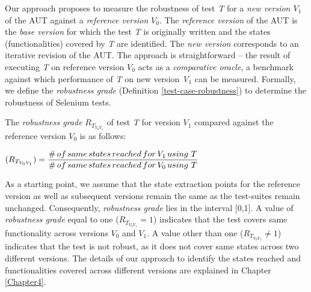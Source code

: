 Our approach proposes to measure the robustness of test \textit{T} for a \textit{new version $V_{1}$} of the AUT against a \textit{reference version} \textit{$V_{0}$}. The \textit{reference version} of the AUT is the \textit{base version} for which the test \textit{T} is originally written and the states (functionalities) covered by \textit{T} are identified. The \textit{new version} corresponds to an iterative revision of the AUT. The approach is straightforward -- the result of executing \textit{T} on reference version \textit{$V_{0}$} acts as a \textit{comparative oracle}, a benchmark against which performance of \textit{T} on new version \textit{V$_{1}$} can be measured. Formally, we define the \textit{
robustness grade} (Definition \ref{test-case-robustness}) to determine the robustness of Selenium tests. 

\theoremstyle{definition}

\begin{definition}{The \textit{robustness grade} $R_{T_{V_{0}V_{1}}}$ of test \textit{T} for version \textit{$V_{1}$} compared against the reference version \textit{$V_{0}$} is as follows:}
\begin{center}
\vspace{0.5cm}
$(R_{T_{V_{0}V_{1}}}) = \displaystyle \frac{\#\thinspace of \thinspace same \thinspace states \thinspace reached \thinspace for \thinspace V_{1} \thinspace using \thinspace \thinspace T}{\# \thinspace of \thinspace same \thinspace states \thinspace reached  \thinspace for \thinspace V_{0} \thinspace using \thinspace \thinspace T}$ \normalsize
\end{center}
\label{test-case-robustness} 
\end{definition} 

As a starting point, we assume that the state extraction points for the reference version as well as subsequent versions remain the same as the test-suites remain unchanged. Consequently, \textit{
robustness grade} lies in the interval [0,1]. A value of \textit{
robustness grade} equal to one ($R_{T_{V_{0}V_{1}}}=1$) indicates that the test covers same functionality across versions \textit{$V_{0}$} and \textit{$V_{1}$}. A value other than one ($R_{T_{V_{0}V_{1}}}\neq 1$) indicates that the test is not robust, as it does not cover same states across two different versions. The details of our approach to identify the states reached and functionalities covered across different versions are explained in Chapter \ref{Chapter4}.


